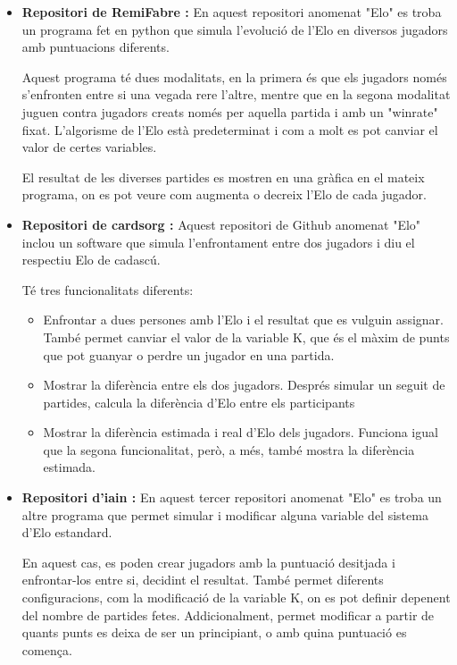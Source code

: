 \documentclass[a4paper]{article}
\begin{document}
\begin{itemize}
    \item \textbf{Repositori de RemiFabre \cite{EloSystemRemi}:} En aquest repositori anomenat "Elo" \space es troba un programa fet en python que simula l'evolució de l'Elo en diversos jugadors amb puntuacions diferents.
    
    Aquest programa té dues modalitats, en la primera és que els jugadors només s'enfronten entre si una vegada rere l'altre, mentre que en la segona modalitat juguen contra jugadors creats només per aquella partida i amb un "winrate" \space fixat. L'algorisme de l'Elo està predeterminat i com a molt es pot canviar el valor de certes variables.
    
    El resultat de les diverses partides es mostren en una gràfica en el mateix programa, on es pot veure com augmenta o decreix l'Elo de cada jugador. 
    
    \item \textbf{Repositori de cardsorg \cite{EloSystemCardsorg}:} Aquest repositori de Github anomenat "Elo" \space inclou un software que simula l'enfrontament entre dos jugadors i diu el respectiu Elo de cadascú. 
    
    Té tres funcionalitats diferents:
    \begin{itemize}
        \item Enfrontar a dues persones amb l'Elo i el resultat que es vulguin assignar. També permet canviar el valor de la variable K, que és el màxim de punts que pot guanyar o perdre un jugador en una partida.
        
        \item  Mostrar la diferència entre els dos jugadors. Després simular un seguit de partides, calcula la diferència d'Elo entre els participants
        
        \item Mostrar la diferència estimada i real d'Elo dels jugadors. Funciona igual que la segona funcionalitat, però, a més, també mostra la diferència estimada.
    \end{itemize}
    
    \item \textbf{Repositori d'iain \cite{EloSystemiain}:} En aquest tercer repositori anomenat "Elo" \space es troba un altre programa que permet simular i modificar alguna variable del sistema d'Elo estandard. 
    
    En aquest cas, es poden crear jugadors amb la puntuació desitjada i enfrontar-los entre si, decidint el resultat. També permet diferents configuracions, com la modificació de la variable K, on es pot definir depenent del nombre de partides fetes. Addicionalment, permet modificar a partir de quants punts es deixa de ser un principiant, o amb quina puntuació es comença.
    

\end{itemize}
\end{document}
